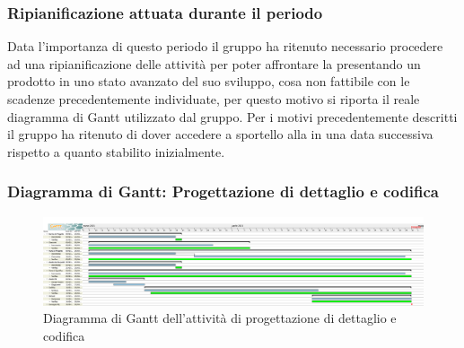 \newpage
\subsubsection{Ripianificazione attuata durante il periodo} \label{RipianificazionePDettaglio}
Data l'importanza di questo periodo il gruppo ha ritenuto necessario procedere ad una ripianificazione delle attività per poter affrontare la  presentando un prodotto in uno stato avanzato del suo sviluppo, cosa non fattibile con le scadenze precedentemente individuate, per questo motivo si riporta il reale diagramma di Gantt utilizzato dal gruppo. Per i motivi precedentemente descritti il gruppo ha ritenuto di dover accedere a sportello alla  in una data successiva rispetto a quanto stabilito inizialmente.
\subsubsection{Diagramma di Gantt: Progettazione di dettaglio e codifica} \label{GanttPDettaglio}
\begin{figure}[ht]
    \centering
    \includegraphics[width=\textwidth]{Immagini/GanttProgettazioneDiDettaglioECodifica}
    \caption{Diagramma di Gantt dell'attività di progettazione di dettaglio e codifica}
\end{figure}